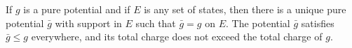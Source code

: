 If $g$ is a pure potential and if $E$ is any set of states, then there is a unique pure potential $\bar{g}$ with support in $E$ such that $\bar{g} = g$ on $E$. The potential $\bar{g}$ satisfies $\bar{g} \leq g$ everywhere, and its total charge does not exceed the total charge of $g$.
